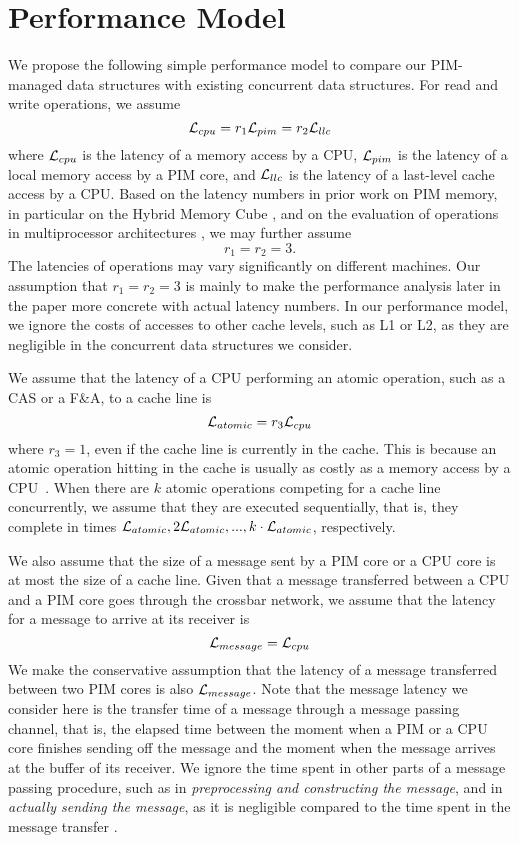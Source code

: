\section{Performance Model}
\label{section:performance_model}

We propose the following simple performance model to compare our
PIM-managed data structures with existing concurrent data structures.
For read and write operations, we assume
$$\mathcal{L}_{cpu} = r_1\mathcal{L}_{pim} = r_2\mathcal{L}_{llc}$$
where $\mathcal{L}_{cpu}$ is the latency of a memory access by a CPU,
$\mathcal{L}_{pim}$ is the latency of a local memory access by a PIM core, and
$\mathcal{L}_{llc}$ is the latency of a last-level cache access by a CPU.
Based on the latency numbers in prior work on PIM memory, 
in particular on the Hybrid Memory Cube \cite{website:HMC, Azarkhish16}, 
and on the evaluation of operations in multiprocessor architectures \cite{David13},
we may further assume 
$$r_1 = r_2 = 3.$$ 
The latencies of operations may vary significantly on different machines.  
Our assumption that $r_1 = r_2 = 3$ is mainly to make the performance analysis later in the paper 
more concrete with actual latency numbers. 
In our performance model, we ignore the costs of accesses to other cache levels, such as L1 or L2, 
as they are negligible in the concurrent data structures we consider.

We assume that the latency of a CPU performing an atomic operation,
such as a CAS or a F\&A, to a cache line is
$$\mathcal{L}_{atomic} = r_3\mathcal{L}_{cpu}$$ 
where $r_3 = 1$, even if the cache line is currently in the cache.
This is because an atomic operation hitting in the cache is usually 
as costly as a memory access by a CPU~\cite{David13}.
When there are $k$ atomic operations competing for a cache line concurrently,
we assume that they are executed sequentially, that is,
they complete in times $\mathcal{L}_{atomic}, 2\mathcal{L}_{atomic},..., k\cdot\mathcal{L}_{atomic}$, respectively.

We also assume that the size of a message sent by a PIM core or a CPU
core is at most the size of a cache line.  Given that a message
transferred between a CPU and a PIM core goes through the crossbar
network, we assume that the latency for a message to arrive at its
receiver is
$$\mathcal{L}_{message} = \mathcal{L}_{cpu}$$
We make the conservative assumption that the latency of a message transferred 
between two PIM cores is also $\mathcal{L}_{message}$.
Note that the message latency we consider here is the transfer time of a message
through a message passing channel, that is, the elapsed time between the moment 
when a PIM or a CPU core finishes sending off the message and the moment when the message arrives at the buffer of its receiver.
We ignore the time spent in other parts of a message passing procedure,
such as in \emph{preprocessing and constructing the message}, and in \emph{actually sending the message},
as it is negligible compared to the time spent in the message transfer \cite{Azarkhish16}.
